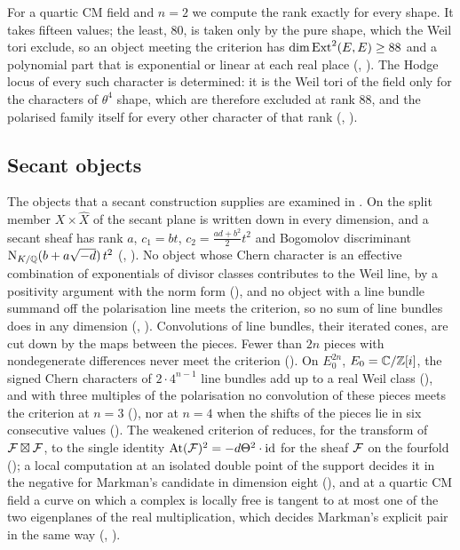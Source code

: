 For a quartic CM field and $n=2$ we compute the rank exactly for every
shape. It takes fifteen values; the least, $80$, is taken only by the pure
shape, which the Weil tori exclude, so an object meeting the criterion has
$\dim\operatorname{Ext}^{2}(E,E)\ge88$ and a polynomial part that is exponential or linear
at each real place (, ). The
Hodge locus of every such character is determined: it is the Weil tori of the
field only for the characters of $\theta^{4}$ shape, which are therefore
excluded at rank $88$, and the polarised family itself for every other
character of that rank (, ).

\subsection{Secant objects}

The objects that a secant construction supplies are examined in
. On the split member $X\times\widehat{X}$ of
 the secant plane is written down in every dimension,
and a secant sheaf has rank $a$, $c_{1}=bt$, $c_{2}=\tfrac{ad+b^{2}}{2}t^{2}$
and Bogomolov discriminant $\mathrm{N}_{K/\mathbb{Q}}(b+a\sqrt{-d})\,t^{2}$
(, ). No object whose Chern character
is an effective combination of exponentials of divisor classes contributes to
the Weil line, by a positivity argument with the norm form
(), and no object with a line bundle summand off the
polarisation line meets the criterion, so no sum of line bundles does in any
dimension (, ). Convolutions of line
bundles, their iterated cones, are cut down by the maps between the pieces.
Fewer than $2n$ pieces with nondegenerate differences never meet the
criterion (). On $E_{0}^{2n}$, $E_{0}=\mathbb{C}/\mathbb{Z}[i]$, the
signed Chern characters of $2\cdot4^{n-1}$ line bundles add up to a real
Weil class (), and with three multiples of the
polarisation no convolution of these pieces meets the criterion at $n=3$
(), nor at $n=4$ when the shifts of the pieces lie
in six consecutive values (). The weakened criterion
of \cite[Question~11.4]{Mar25b} reduces, for the transform of
$\mathcal{F}\boxtimes\mathcal{F}$, to the single identity
$\mathrm{At}(\mathcal{F})^{2}=-d\Theta^{2}\cdot\operatorname{id}$ for the sheaf $\mathcal{F}$ on the
fourfold (); a local computation at an isolated double point
of the support decides it in the negative for Markman's candidate in
dimension eight (), and at a quartic CM field a
curve on which a complex is locally free is tangent to at most one of the two
eigenplanes of the real multiplication, which decides Markman's explicit pair
\cite[Example~11.2.7]{Mar25c} in the same way (,
).

